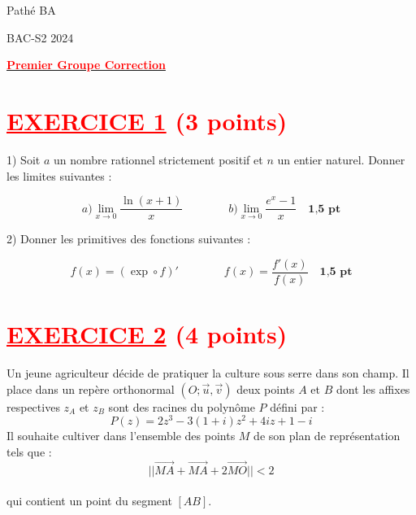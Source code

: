 \documentclass[12pt]{article}
\begin{document}
\begin{minipage}{0.8\textwidth}
	Pathé BA                          
\end{minipage}
\begin{minipage}{0.8\textwidth}
	BAC-S2 2024
\end{minipage}

\begin{center}
\textbf{{\underline{\textcolor{red}{Premier Groupe Correction}}}}
\end{center}





\section*{\textcolor{red}{\underline{EXERCICE 1} (3 points) }}
1) Soit \(a\) un nombre rationnel strictement positif et \(n\) un entier naturel. Donner les limites suivantes :

\[
a) \lim_{x \to 0} \frac{\ln(x+1)}{x}\quad\quad\quad\quad b) \lim_{x \to 0} \frac{e^x - 1}{x}\quad \textbf{1,5 pt} \]


2) Donner les primitives des fonctions suivantes :

\[
 f(x) = ( \exp \circ f)' \quad\quad\quad\quad f(x) = \frac{f'(x)}{f(x)}  \quad \textbf{1,5 pt}
\]

\section*{\textcolor{red}{\underline{EXERCICE 2} (4 points) }}
Un jeune agriculteur décide de pratiquer la culture sous serre dans son champ. Il place dans un repère orthonormal \( (O; \vec{u}, \vec{v}) \) deux points \( A \) et \( B \) dont les affixes respectives \( z_A \) et \( z_B \) sont des racines du polynôme \( P \) défini par :
\[
P(z) = 2z^3 - 3(1+i)z^2 + 4iz + 1 - i
\]
Il souhaite cultiver dans l'ensemble des points \( M \) de son plan de représentation tels que :
\[
||\overrightarrow{MA} + \overrightarrow{MA} + 2\overrightarrow{MO}|| < 2
\]\\
qui contient un point du segment \( [AB] \).
\end{document}
